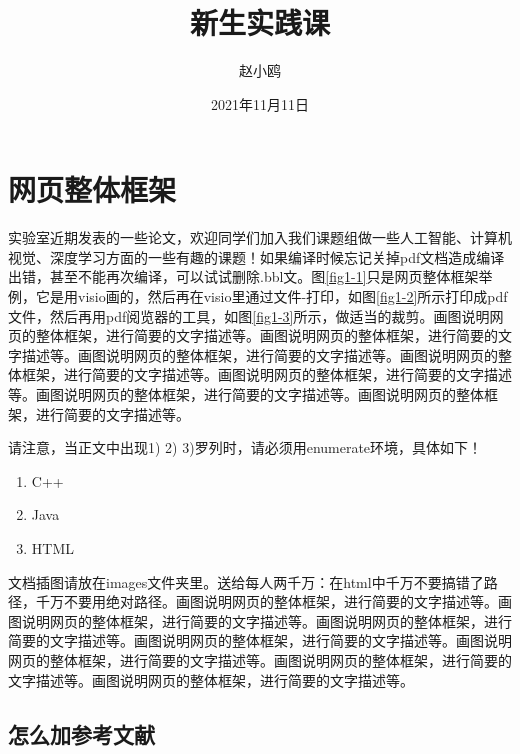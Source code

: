 \documentclass[supercite]{Experimental_Report}
\title{~~~~~~新生实践课~~~~~~}
\author{赵小鸥}
\date{2021年11月11日}
\theoremstyle{definition}
\begin{document}
\maketitle

\clearpage


\tableofcontents[level=2]

\clearpage


\section{网页整体框架}

实验室近期发表的一些论文\cite{Li2022AAAI, Chen2021MMA, Chen2022IMC, Ren2021JVCI, Ren2022MTAP}，欢迎同学们加入我们课题组做一些人工智能、计算机视觉、深度学习方面的一些有趣的课题！如果编译时候忘记关掉pdf文档造成编译出错，甚至不能再次编译，可以试试删除.bbl文。图\ref{fig1-1}只是网页整体框架举例，它是用visio画的，然后再在visio里通过文件-打印，如图\ref{fig1-2}所示打印成pdf文件，然后再用pdf阅览器的工具，如图\ref{fig1-3}所示，做适当的裁剪。画图说明网页的整体框架，进行简要的文字描述等。画图说明网页的整体框架，进行简要的文字描述等。画图说明网页的整体框架，进行简要的文字描述等。画图说明网页的整体框架，进行简要的文字描述等。画图说明网页的整体框架，进行简要的文字描述等。画图说明网页的整体框架，进行简要的文字描述等。画图说明网页的整体框架，进行简要的文字描述等。

请注意，当正文中出现1) 2) 3)罗列时，请必须用enumerate环境，具体如下！

\begin{enumerate}
	\renewcommand{\labelenumi}{\theenumi)}
	\item C++
	\item Java
	\item HTML
\end{enumerate}

文档插图请放在images文件夹里。送给每人两千万：在html中千万不要搞错了路径，千万不要用绝对路径。画图说明网页的整体框架，进行简要的文字描述等。画图说明网页的整体框架，进行简要的文字描述等。画图说明网页的整体框架，进行简要的文字描述等。画图说明网页的整体框架，进行简要的文字描述等。画图说明网页的整体框架，进行简要的文字描述等。画图说明网页的整体框架，进行简要的文字描述等。画图说明网页的整体框架，进行简要的文字描述等。

\subsection{怎么加参考文献}
\end{document}
